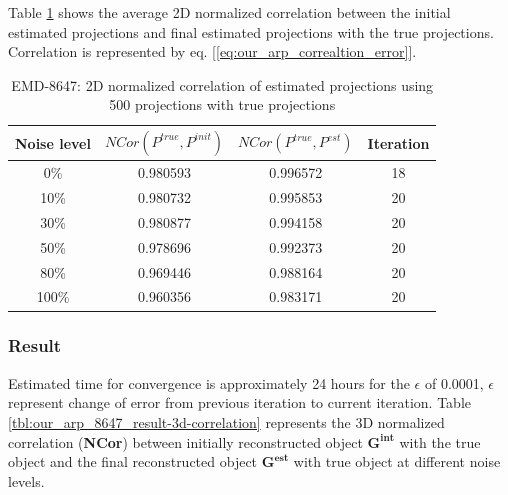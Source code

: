 \documentclass{report}
\begin{document}
Table \ref{tbl:our_arp_8647_result-2d-correlation} shows the average 2D normalized correlation between the initial estimated projections and final estimated projections with the true projections. Correlation is represented by eq. [\ref{eq:our_arp_correaltion_error}]. 
\begin{table}[H]
    \centering
     \begin{tabular}{||c c c c ||} 
             \hline
             Noise level & $NCor(P^{true},P^{init})$  &   $ NCor(P^{true},P^{est})$ & Iteration \\
            \hline\hline
            0\% & 0.980593 & 0.996572 & 18 \\
            \hline
            10\% &  0.980732 & 0.995853 & 20  \\
            \hline
            30\% &  0.980877 &  0.994158 & 20  \\
            \hline
            50\% & 0.978696 & 0.992373 & 20 \\
            \hline
            80\% & 0.969446 & 0.988164 & 20 \\
            \hline
            100\%& 0.960356 & 0.983171 & 20 \\
            \hline
    \end{tabular}
    \caption{EMD-8647: 2D normalized correlation of estimated projections using 500 projections with true projections }
    \label{tbl:our_arp_8647_result-2d-correlation}
\end{table}

\subsubsection{Result}

Estimated time for convergence is approximately 24 hours for the $\epsilon$  of 0.0001, $\epsilon$ represent change of error from previous iteration to current iteration. Table \ref{tbl:our_arp_8647_result-3d-correlation} represents the 3D normalized correlation (\textbf{NCor}) between initially reconstructed object $\boldsymbol{G^{int}}$ with the true object and the final reconstructed object $\boldsymbol{G^{est}}$ with true object at different noise levels. 
\end{document}
